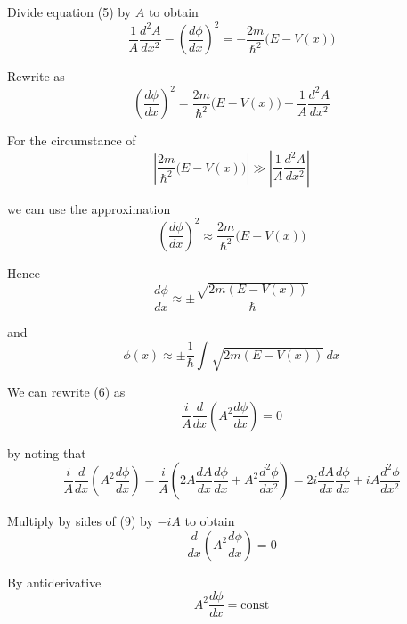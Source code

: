 Divide equation (5) by $A$ to obtain
\begin{equation*}
\frac{1}{A}\frac{d^2A}{dx^2}-\left(\frac{d\phi}{dx}\right)^2
=-\frac{2m}{\hbar^2}\bigl(E-V(x)\bigr)
\end{equation*}

Rewrite as
\begin{equation*}
\left(\frac{d\phi}{dx}\right)^2
=\frac{2m}{\hbar^2}\bigl(E-V(x)\bigr)+\frac{1}{A}\frac{d^2A}{dx^2}
\end{equation*}

For the circumstance of
\begin{equation*}
\left|\frac{2m}{\hbar^2}\bigl(E-V(x)\bigr)\right|
\gg
\left|\frac{1}{A}\frac{d^2A}{dx^2}\right|
\end{equation*}

we can use the approximation
\begin{equation*}
\left(\frac{d\phi}{dx}\right)^2\approx\frac{2m}{\hbar^2}\bigl(E-V(x)\bigr)
\end{equation*}

Hence
\begin{equation*}
\frac{d\phi}{dx}\approx\pm\frac{\sqrt{2m(E-V(x))}}{\hbar}
\tag{7}
\end{equation*}

and
\begin{equation*}
\phi(x)\approx\pm\frac{1}{\hbar}\int\sqrt{2m(E-V(x))}\,dx
\tag{8}
\end{equation*}

We can rewrite (6) as
\begin{equation*}
\frac{i}{A}\frac{d}{dx}\left(A^2\frac{d\phi}{dx}\right)=0
\tag{9}
\end{equation*}

by noting that
\begin{equation*}
\frac{i}{A}\frac{d}{dx}\left(A^2\frac{d\phi}{dx}\right)
=\frac{i}{A}\left(2A\frac{dA}{dx}\frac{d\phi}{dx}+A^2\frac{d^2\phi}{dx^2}\right)
=2i\frac{dA}{dx}\frac{d\phi}{dx}+iA\frac{d^2\phi}{dx^2}
\end{equation*}

Multiply by sides of (9) by $-iA$ to obtain
\begin{equation*}
\frac{d}{dx}\left(A^2\frac{d\phi}{dx}\right)=0
\end{equation*}

By antiderivative
\begin{equation*}
A^2\frac{d\phi}{dx}=\text{const}
\end{equation*}

